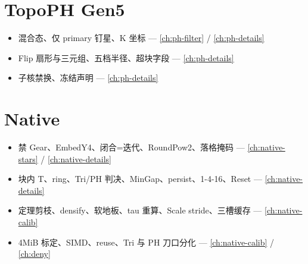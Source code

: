 \section{TopoPH Gen5}

\begin{itemize}[nosep]
  \item 混合态、仅 primary 钉星、K 坐标 — \cref{ch:ph-filter} / \cref{ch:ph-details}
  \item Flip 扇形与三元组、五档半径、超块字段 — \cref{ch:ph-details}
  \item 子核禁换、冻结声明 — \cref{ch:ph-details}
\end{itemize}

\section{Native}

\begin{itemize}[nosep]
  \item 禁 Gear、EmbedY4、闭合=迭代、RoundPow2、落格掩码 — \cref{ch:native-stars} / \cref{ch:native-details}
  \item 块内 T、ring、Tri/PH 判决、MinGap、persist、1-4-16、Reset — \cref{ch:native-details}
  \item 定理剪枝、densify、软地板、tau 重算、Scale stride、三槽缓存 — \cref{ch:native-calib}
  \item 4MiB 标定、SIMD、reuse、Tri 与 PH 刀口分化 — \cref{ch:native-calib} / \cref{ch:deny}
\end{itemize}
